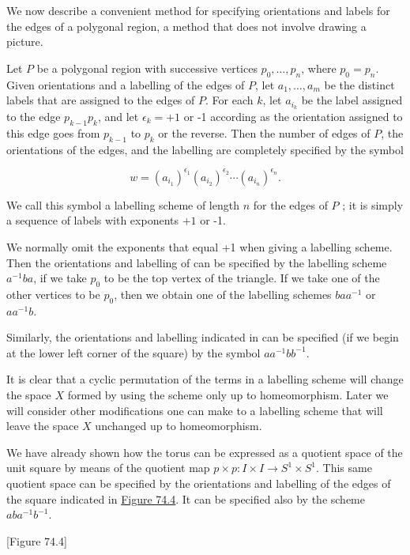 We now describe a convenient method for specifying orientations and labels for the edges of a polygonal region, a method that does not involve drawing a picture.

\begin{definition}
	Let \(P\) be a polygonal region with successive vertices \(p_{0},\ldots ,p_{n}\), where \(p_{0} = p_{n}\). Given orientations and a labelling of the edges of \(P\), let \(a_{1},\ldots ,a_{m}\) be the distinct labels that are assigned to the edges of \(P\). For each \(k\), let \(a_{i_{k}}\) be the label assigned to the edge \(p_{k - 1}p_{k}\), and let \({\epsilon }_{k} = + 1\) or -1 according as the orientation assigned to this edge goes from \(p_{k - 1}\) to \(p_{k}\) or the reverse. Then the number of edges of \(P\), the orientations of the edges, and the labelling are completely specified by the symbol

\[
w = {( a_{i_{1}}) }^{{\epsilon }_{1}}{( a_{i_{2}}) }^{{\epsilon }_{2}}\cdots {( a_{i_{n}}) }^{{\epsilon }_{n}}.
\]

We call this symbol a labelling scheme of length \(n\) for the edges of \(P\) ; it is simply a sequence of labels with exponents \(+ 1\) or -1.
\end{definition}

We normally omit the exponents that equal +1 when giving a labelling scheme. Then the orientations and labelling of  can be specified by the labelling scheme \(a^{-1}{ba}\), if we take \(p_{0}\) to be the top vertex of the triangle. If we take one of the other vertices to be \(p_{0}\), then we obtain one of the labelling schemes \({ba}a^{-1}\) or \(aa^{-1}b\).

Similarly, the orientations and labelling indicated in  can be specified (if we begin at the lower left corner of the square) by the symbol \(aa^{-1}bb^{-1}\).

It is clear that a cyclic permutation of the terms in a labelling scheme will change the space \(X\) formed by using the scheme only up to homeomorphism. Later we will consider other modifications one can make to a labelling scheme that will leave the space \(X\) unchanged up to homeomorphism.

\begin{centeredblock}
\begin{example}
\label{ex:\thesection.\theexample}
	We have already shown how the torus can be expressed as a quotient space of the unit square by means of the quotient map \(p \times p : I \times I \rightarrow {S}^{1} \times {S}^{1}\). This same quotient space can be specified by the orientations and labelling of the edges of the square indicated in \hyperref[fig:74.4]{Figure 74.4}. It can be specified also by the scheme \({ab}a^{-1}b^{-1}\).

[Figure 74.4]
\end{example}
\end{centeredblock}

